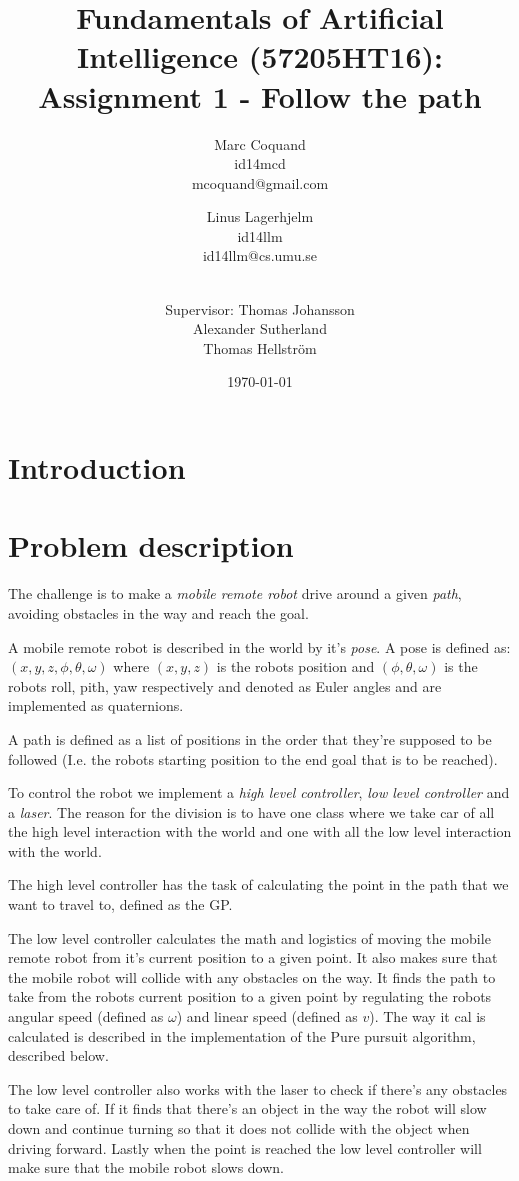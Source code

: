 \documentclass[12pt]{article}
\title{Fundamentals of Artificial Intelligence (57205HT16): Assignment 1 -
Follow the path}
\author{
    Marc Coquand \\ 
    id14mcd \\
    mcoquand@gmail.com \and
		Linus Lagerhjelm \\
		id14llm \\
		id14llm@cs.umu.se \and \\
		Supervisor: Thomas Johansson\\
		Alexander Sutherland \\
		Thomas Hellström
}
\date{\today}
\begin{document}
\maketitle

\newpage
\tableofcontents

\newpage
\section{Introduction}


\section{Problem description}

The challenge is to make a \textit{mobile remote robot} drive around a given
\textit{path}, avoiding obstacles in the way and reach the goal. 

A mobile remote robot is described in the world by it's \textit{pose}. A pose is
defined as: $(x, y, z, \phi, \theta, \omega)$ where $(x,y,z)$ is the robots
position and $(\phi, \theta, \omega)$ is the robots roll, pith, yaw respectively
and denoted as Euler angles and are implemented as quaternions.

A path is defined as a list of positions in the order that they're supposed to
be followed (I.e. the robots starting position to the end goal that is to be
reached).

To control the robot we implement a \textit{high level controller}, \textit{low
level controller} and a \textit{laser}. The reason for the division is to have
one class where we take car of all the high level interaction with the world and
one with all the low level interaction with the world. 

The high level controller has the task of calculating the point in the path that
we want to travel to, defined as the GP. 

The low level controller calculates the math and logistics of moving the mobile
remote robot from it's current position to a given point. It also makes sure
that the mobile robot will collide with any obstacles on the way. It finds the
path to take from the robots current position to a given point by regulating the
robots angular speed (defined as $\omega$) and linear speed (defined as $v$).
The way it cal is calculated is described in the implementation of the Pure
pursuit algorithm, described below.

The low level controller also works with the laser to check if there's any
obstacles to take care of. If it finds that there's an object in the way the
robot will slow down and continue turning so that it does not collide with the
object when driving forward. Lastly when the point is reached the low level
controller will make sure that the mobile robot slows down.  
\end{document}

